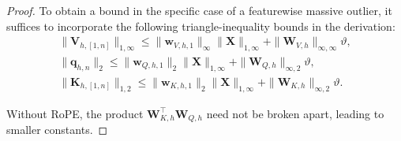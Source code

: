 \documentclass[10pt,a4paper]{amsart}
\newcommand{\Matrix}[1]{\mathbf{#1}}
\newcommand{\Norm}[3][]{#1\| #2 #1\|_{\mathrm{#3}}}
\newcommand{\trans}{\intercal}
\begin{document}
\begin{proof}
To obtain a bound in the specific case of a featurewise massive outlier, it suffices to incorporate the following triangle-inequality bounds in the derivation:
\begin{gather*}
    \Norm{\Matrix{V}_{h,[1,n]}}{1,\infty} \leq \Norm{\Matrix{w}_{V,h,1}}{\infty} \Norm{\Matrix{X}}{1,\infty} + \Norm{\Matrix{W}_{V,h}}{\infty,\infty} \vartheta, \\
    \Norm{\Matrix{q}_{h,n}}{2} \leq \Norm{\Matrix{w}_{Q,h,1}}{2} \Norm{\Matrix{X}}{1,\infty} + \Norm{\Matrix{W}_{Q,h}}{\infty,2} \vartheta, \\
    \Norm{\Matrix{K}_{h,[1,n]}}{1,2} \leq \Norm{\Matrix{w}_{K,h,1}}{2} \Norm{\Matrix{X}}{1,\infty} + \Norm{\Matrix{W}_{K,h}}{\infty,2} \vartheta.
\end{gather*}

Without RoPE, the product $\Matrix{W}_{K,h}^\trans \Matrix{W}_{Q,h}$ need not be broken apart, leading to smaller constants.
\end{proof}
\end{document}
